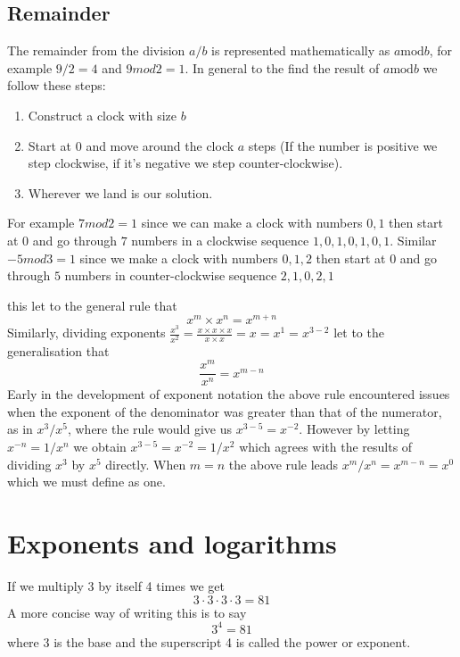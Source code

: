 \subsection{Remainder}
The remainder from the division $a/b$ is represented mathematically as $a \textrm{mod} b$, for example $9/2 = 4$ and $9 mod 2 = 1$. In general to the find the result of $a \textrm{mod} b$ we follow these steps:
\begin{enumerate}
\item Construct a clock with size $b$
\item Start at 0 and move around the clock $a$ steps (If the number is positive we step clockwise, if it's negative we step counter-clockwise).
\item Wherever we land is our solution.
\end{enumerate}
For example $7 mod 2 = 1$ since we can make a clock with numbers $0,1$ then start at $0$ and go through $7$ numbers in a clockwise sequence $1,0,1,0,1,0,1$. Similar $-5 mod 3 = 1$ since we make a clock with numbers $0,1,2$ then start at $0$ and go through $5$ numbers in counter-clockwise sequence  $2,1,0,2,1$




this let to the general rule that
\[
x^m \times x^n = x^{m+n}
\]
Similarly, dividing exponents $\frac{x^3}{x^2} = \frac{x \times x \times x}{x \times x} = x = x^1 = x^{3-2}$ let to the generalisation that 
\[
\frac{x^m}{x^n} = x^{m-n}
\]
Early in the development of exponent notation the above rule encountered issues when the exponent of the denominator was greater than that of the numerator, as in $x^3/x^5$, where the rule would give us $x^{3-5} = x^{-2}$. However by letting $x^{-n} = 1/x^n$ we obtain $x^{3-5} = x^{-2} = 1/x^2$ which agrees with the results of dividing $x^3$ by $x^5$ directly. When $m = n$ the above rule leads $x^m/x^n = x^{m-n} = x^0$ which we must define as one. 

\section{Exponents and logarithms}\label{arit:exp}
If we multiply 3 by itself 4 times we get
\[
3 \cdot 3 \cdot 3 \cdot 3 = 81
\]
A more concise way of writing this is to say
\[
3^4 = 81
\]
where 3 is the base and the superscript 4 is called the power or exponent.



